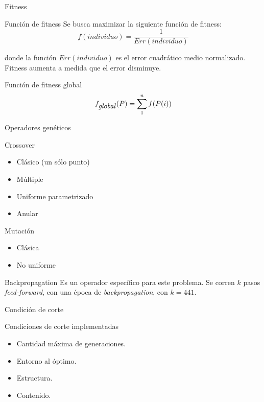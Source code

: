 \documentclass{beamer}
\begin{document}
\begin{frame}{Fitness}
\begin{block}{Función de fitness}
Se busca maximizar la siguiente función de fitness:
\begin{equation}
       f(individuo) = \frac{1}{Err(individuo)}
\end{equation}

donde la función $Err(individuo)$ es el error cuadrático medio normalizado. Fitness aumenta a medida que el error disminuye.
\end{block}

\begin{block}{Función de fitness global}
\begin{equation}
      f_{\mbox{\emph{global}}}(P) = \sum_{1}^{n} f(P(i))
\end{equation}
\end{block}
\end{frame}

\begin{frame}{Operadores genéticos}
\begin{block}{Crossover}
    \begin{itemize}
     \item Clásico (un sólo punto)
     \item Múltiple
     \item Uniforme parametrizado
     \item Anular
    \end{itemize}
\end{block}

\begin{block}{Mutación}
    \begin{itemize}
      \item Clásica
      \item No uniforme
    \end{itemize}
\end{block}

\begin{block}{Backpropagation}
Es un operador específico para este problema. Se corren $k$ pasos \textit{feed-forward}, con una época de \textit{backpropagation}, con $k = 441$.
\end{block}
\end{frame}

\begin{frame}{Condición de corte}
\begin{block}{Condiciones de corte implementadas}
\begin{itemize}
       \item Cantidad máxima de generaciones.
       \item Entorno al óptimo.
       \item Estructura.
       \item Contenido.
\end{itemize}
\end{block}
\end{frame}
\end{document}
